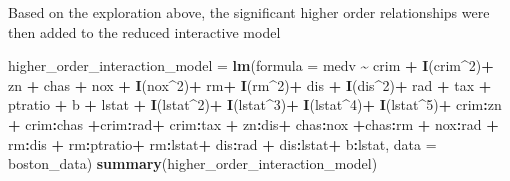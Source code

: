 \documentclass[
]{article}
\newenvironment{Shaded}{\begin{snugshade}}{\end{snugshade}}
\newcommand{\AttributeTok}[1]{\textcolor[rgb]{0.13,0.29,0.53}{#1}}
\newcommand{\DecValTok}[1]{\textcolor[rgb]{0.00,0.00,0.81}{#1}}
\newcommand{\FunctionTok}[1]{\textcolor[rgb]{0.13,0.29,0.53}{\textbf{#1}}}
\newcommand{\NormalTok}[1]{#1}
\newcommand{\OtherTok}[1]{\textcolor[rgb]{0.56,0.35,0.01}{#1}}
\newcommand{\SpecialCharTok}[1]{\textcolor[rgb]{0.81,0.36,0.00}{\textbf{#1}}}
\begin{document}
Based on the exploration above, the significant higher order
relationships were then added to the reduced interactive model

\begin{Shaded}
\begin{Highlighting}[]
\NormalTok{higher\_order\_interaction\_model }\OtherTok{=} \FunctionTok{lm}\NormalTok{(}\AttributeTok{formula =}\NormalTok{ medv }\SpecialCharTok{\textasciitilde{}}\NormalTok{ crim }\SpecialCharTok{+} \FunctionTok{I}\NormalTok{(crim}\SpecialCharTok{\^{}}\DecValTok{2}\NormalTok{)}\SpecialCharTok{+}\NormalTok{ zn }\SpecialCharTok{+}\NormalTok{ chas }\SpecialCharTok{+}\NormalTok{ nox }\SpecialCharTok{+} \FunctionTok{I}\NormalTok{(nox}\SpecialCharTok{\^{}}\DecValTok{2}\NormalTok{)}\SpecialCharTok{+}\NormalTok{ rm}\SpecialCharTok{+} \FunctionTok{I}\NormalTok{(rm}\SpecialCharTok{\^{}}\DecValTok{2}\NormalTok{)}\SpecialCharTok{+}\NormalTok{ dis }\SpecialCharTok{+} \FunctionTok{I}\NormalTok{(dis}\SpecialCharTok{\^{}}\DecValTok{2}\NormalTok{)}\SpecialCharTok{+}\NormalTok{ rad }\SpecialCharTok{+}\NormalTok{ tax }\SpecialCharTok{+}\NormalTok{ ptratio }\SpecialCharTok{+}\NormalTok{ b }\SpecialCharTok{+}\NormalTok{ lstat }\SpecialCharTok{+} \FunctionTok{I}\NormalTok{(lstat}\SpecialCharTok{\^{}}\DecValTok{2}\NormalTok{)}\SpecialCharTok{+} \FunctionTok{I}\NormalTok{(lstat}\SpecialCharTok{\^{}}\DecValTok{3}\NormalTok{)}\SpecialCharTok{+} \FunctionTok{I}\NormalTok{(lstat}\SpecialCharTok{\^{}}\DecValTok{4}\NormalTok{)}\SpecialCharTok{+} \FunctionTok{I}\NormalTok{(lstat}\SpecialCharTok{\^{}}\DecValTok{5}\NormalTok{)}\SpecialCharTok{+}\NormalTok{ crim}\SpecialCharTok{:}\NormalTok{zn }\SpecialCharTok{+}\NormalTok{ crim}\SpecialCharTok{:}\NormalTok{chas  }\SpecialCharTok{+}\NormalTok{crim}\SpecialCharTok{:}\NormalTok{rad}\SpecialCharTok{+}\NormalTok{ crim}\SpecialCharTok{:}\NormalTok{tax }\SpecialCharTok{+}\NormalTok{ zn}\SpecialCharTok{:}\NormalTok{dis}\SpecialCharTok{+}\NormalTok{ chas}\SpecialCharTok{:}\NormalTok{nox }\SpecialCharTok{+}\NormalTok{chas}\SpecialCharTok{:}\NormalTok{rm }\SpecialCharTok{+}\NormalTok{ nox}\SpecialCharTok{:}\NormalTok{rad }\SpecialCharTok{+}\NormalTok{ rm}\SpecialCharTok{:}\NormalTok{dis }\SpecialCharTok{+}\NormalTok{ rm}\SpecialCharTok{:}\NormalTok{ptratio}\SpecialCharTok{+}\NormalTok{ rm}\SpecialCharTok{:}\NormalTok{lstat}\SpecialCharTok{+}\NormalTok{ dis}\SpecialCharTok{:}\NormalTok{rad }\SpecialCharTok{+}\NormalTok{ dis}\SpecialCharTok{:}\NormalTok{lstat}\SpecialCharTok{+}\NormalTok{ b}\SpecialCharTok{:}\NormalTok{lstat, }\AttributeTok{data =}\NormalTok{ boston\_data)}
\FunctionTok{summary}\NormalTok{(higher\_order\_interaction\_model)}
\end{Highlighting}
\end{Shaded}
\end{document}
